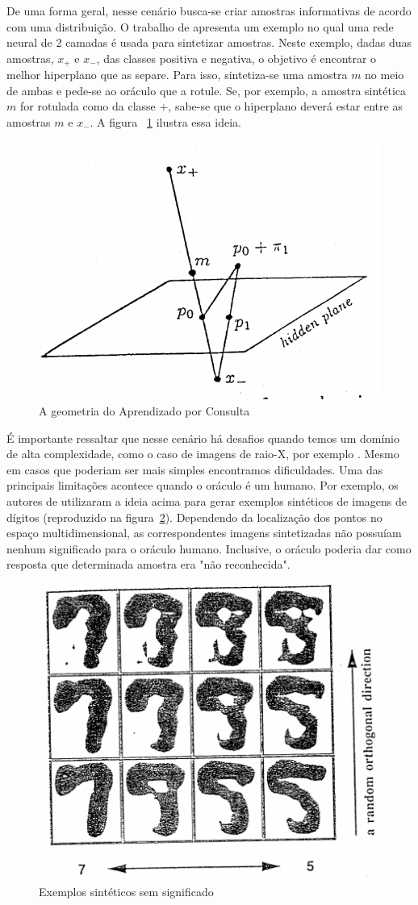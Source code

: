 De uma forma geral, nesse cenário busca-se criar amostras informativas de acordo com uma distribuição. O trabalho de \citep{baum1992query} apresenta um exemplo no qual uma rede neural de 2 camadas é usada para sintetizar amostras. Neste exemplo, dadas duas amostras, $x_+$ e $x_-$, das classes positiva e negativa, o objetivo é encontrar o melhor hiperplano que as separe. Para isso, sintetiza-se uma amostra $m$ no meio de ambas e pede-se ao oráculo que a rotule. Se, por exemplo, a amostra sintética $m$ for rotulada como da classe $+$, sabe-se que o hiperplano deverá estar entre as amostras $m$ e $x_-$. A figura ~\ref{fig:LangBaum_GeometryQueryLearning} ilustra essa ideia. 

\begin{figure}
  \centering
  \includegraphics[width=.4\textwidth]{figures/lang_baum_geometry_query_learning.png}
  \caption{A geometria do Aprendizado por Consulta \citep{baum1992query}}
  \label{fig:LangBaum_GeometryQueryLearning}
\end{figure}

É importante ressaltar que nesse cenário há desafios quando temos um domínio de alta complexidade, como o caso de imagens de raio-X, por exemplo \citep{angluin1988queries}. Mesmo em casos que poderiam ser mais simples encontramos dificuldades. Uma das principais limitações acontece quando o oráculo é um humano. Por exemplo, os autores de \cite{baum1992query} utilizaram a ideia acima para gerar exemplos sintéticos de imagens de dígitos (reproduzido na figura~\ref{fig:LangBaum_5vs9Example}). Dependendo da localização dos pontos no espaço multidimensional, as correspondentes imagens sintetizadas não possuíam nenhum significado para o oráculo humano. Inclusive, o oráculo poderia dar como resposta que determinada amostra era "não reconhecida".

\begin{figure}
  \centering
  \includegraphics[width=.4\textwidth]{figures/lang_baum_5_vs_9_example.png}
  \caption{Exemplos sintéticos sem significado \citep{baum1992query}}
  \label{fig:LangBaum_5vs9Example}
\end{figure}

